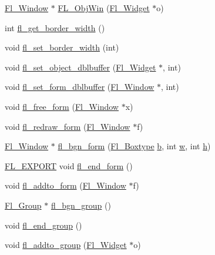 \begin{DoxyCompactItemize}
\hyperlink{class_fl___window}{Fl\+\_\+\+Window} $\ast$ \hyperlink{forms_8_h_af0e3f03c47997444eb52156afb81faad}{F\+L\+\_\+\+Obj\+Win} (\hyperlink{class_fl___widget}{Fl\+\_\+\+Widget} $\ast$o)
\item 
int \hyperlink{forms_8_h_a6d7fa702ec6c32ec9dd81b04d27c6354}{fl\+\_\+get\+\_\+border\+\_\+width} ()
\item 
void \hyperlink{forms_8_h_ad335cb80b3fb9f9090c2f13dce23c204}{fl\+\_\+set\+\_\+border\+\_\+width} (int)
\item 
void \hyperlink{forms_8_h_a7445900d46aadb7d26444cc03a216a33}{fl\+\_\+set\+\_\+object\+\_\+dblbuffer} (\hyperlink{class_fl___widget}{Fl\+\_\+\+Widget} $\ast$, int)
\item 
void \hyperlink{forms_8_h_a2ecd4278bcb8e352aa6083b7d68d0776}{fl\+\_\+set\+\_\+form\+\_\+dblbuffer} (\hyperlink{class_fl___window}{Fl\+\_\+\+Window} $\ast$, int)
\item 
void \hyperlink{forms_8_h_a9e3b4816ffcf7765b1230042deab4991}{fl\+\_\+free\+\_\+form} (\hyperlink{class_fl___window}{Fl\+\_\+\+Window} $\ast$x)
\item 
void \hyperlink{forms_8_h_adda17639c57ac2cbd72a41acd10b3f0f}{fl\+\_\+redraw\+\_\+form} (\hyperlink{class_fl___window}{Fl\+\_\+\+Window} $\ast$f)
\item 
\hyperlink{class_fl___window}{Fl\+\_\+\+Window} $\ast$ \hyperlink{forms_8_h_ac4baf300e67a81faabace301e4ac825f}{fl\+\_\+bgn\+\_\+form} (\hyperlink{_enumerations_8_h_ae48bf9070f8541de17829f54ccacc6bc}{Fl\+\_\+\+Boxtype} \hyperlink{forms_8_h_a0ba06a290a384fa06b1b90745827dae2}{b}, int \hyperlink{forms_8_h_aac374e320caaadeca4874add33b62af2}{w}, int \hyperlink{forms_8_h_a7e427ba5b307f9068129699250690066}{h})
\item 
\hyperlink{_fl___export_8_h_aa9ba29a18aee9d738370a06eeb4470fc}{F\+L\+\_\+\+E\+X\+P\+O\+RT} void \hyperlink{forms_8_h_af4354aee4238d9385408caaf806331cb}{fl\+\_\+end\+\_\+form} ()
\item 
void \hyperlink{forms_8_h_a5b131e3b7115e43fd878ae9e9c88b7cc}{fl\+\_\+addto\+\_\+form} (\hyperlink{class_fl___window}{Fl\+\_\+\+Window} $\ast$f)
\item 
\hyperlink{class_fl___group}{Fl\+\_\+\+Group} $\ast$ \hyperlink{forms_8_h_a9e241b32f64d1ea9c872dbfad4057513}{fl\+\_\+bgn\+\_\+group} ()
\item 
void \hyperlink{forms_8_h_acf808e652d7194c432cf06e26bccb592}{fl\+\_\+end\+\_\+group} ()
\item 
void \hyperlink{forms_8_h_a7dbd75bcca7465c2483bfcf75c8115ef}{fl\+\_\+addto\+\_\+group} (\hyperlink{class_fl___widget}{Fl\+\_\+\+Widget} $\ast$o)

\end{DoxyCompactItemize}
